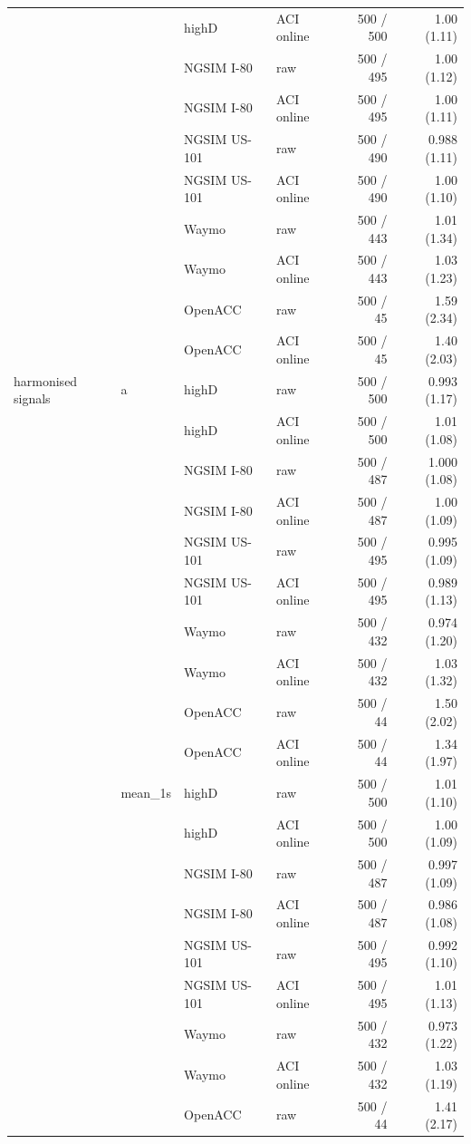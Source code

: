 \begin{longtable}{llllrr}
 &  & highD & ACI online & 500 / 500 & 1.00 (1.11) \\
 &  & NGSIM I-80 & raw & 500 / 495 & 1.00 (1.12) \\
 &  & NGSIM I-80 & ACI online & 500 / 495 & 1.00 (1.11) \\
 &  & NGSIM US-101 & raw & 500 / 490 & 0.988 (1.11) \\
 &  & NGSIM US-101 & ACI online & 500 / 490 & 1.00 (1.10) \\
 &  & Waymo & raw & 500 / 443 & 1.01 (1.34) \\
 &  & Waymo & ACI online & 500 / 443 & 1.03 (1.23) \\
 &  & OpenACC & raw & 500 / 45 & 1.59 (2.34) \\
 &  & OpenACC & ACI online & 500 / 45 & 1.40 (2.03) \\
\midrule
harmonised signals & a & highD & raw & 500 / 500 & 0.993 (1.17) \\
 &  & highD & ACI online & 500 / 500 & 1.01 (1.08) \\
 &  & NGSIM I-80 & raw & 500 / 487 & 1.000 (1.08) \\
 &  & NGSIM I-80 & ACI online & 500 / 487 & 1.00 (1.09) \\
 &  & NGSIM US-101 & raw & 500 / 495 & 0.995 (1.09) \\
 &  & NGSIM US-101 & ACI online & 500 / 495 & 0.989 (1.13) \\
 &  & Waymo & raw & 500 / 432 & 0.974 (1.20) \\
 &  & Waymo & ACI online & 500 / 432 & 1.03 (1.32) \\
 &  & OpenACC & raw & 500 / 44 & 1.50 (2.02) \\
 &  & OpenACC & ACI online & 500 / 44 & 1.34 (1.97) \\
\midrule
 & mean\_1s & highD & raw & 500 / 500 & 1.01 (1.10) \\
 &  & highD & ACI online & 500 / 500 & 1.00 (1.09) \\
 &  & NGSIM I-80 & raw & 500 / 487 & 0.997 (1.09) \\
 &  & NGSIM I-80 & ACI online & 500 / 487 & 0.986 (1.08) \\
 &  & NGSIM US-101 & raw & 500 / 495 & 0.992 (1.10) \\
 &  & NGSIM US-101 & ACI online & 500 / 495 & 1.01 (1.13) \\
 &  & Waymo & raw & 500 / 432 & 0.973 (1.22) \\
 &  & Waymo & ACI online & 500 / 432 & 1.03 (1.19) \\
 &  & OpenACC & raw & 500 / 44 & 1.41 (2.17) \\

\end{longtable}
